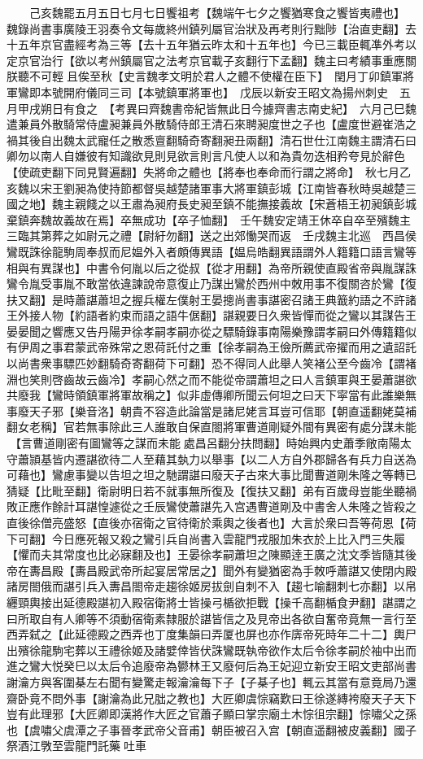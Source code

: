 　　己亥魏罷五月五日七月七日饗祖考【魏端午七夕之饗猶寒食之饗皆夷禮也】　魏錄尚書事廣陵王羽奏令文每歲終州鎮列屬官治狀及再考則行黜陟【治直吏翻】去十五年京官盡經考為三等【去十五年猶云昨太和十五年也】今已三載臣輒凖外考以定京官治行【欲以考州鎮屬官之法考京官載子亥翻行下孟翻】魏主曰考績事重應關朕聽不可輕且俟至秋【史言魏孝文明於君人之體不使權在臣下】　閏月丁卯鎮軍將軍鸞即本號開府儀同三司【本號鎮軍將軍也】　戊辰以新安王昭文為揚州刺史　五月甲戌朔日有食之　【考異曰齊魏書帝紀皆無此日今據齊書志南史紀】　六月己巳魏遣兼員外散騎常侍盧昶兼員外散騎侍郎王清石來聘昶度世之子也【盧度世避崔浩之禍其後自出魏太武寵任之散悉亶翻騎奇寄翻昶丑兩翻】清石世仕江南魏主謂清石曰卿勿以南人自嫌彼有知識欲見則見欲言則言凡使人以和為貴勿迭相矜夸見於辭色【使疏吏翻下同見賢遍翻】失將命之體也【將奉也奉命而行謂之將命】　秋七月乙亥魏以宋王劉昶為使持節都督吳越楚諸軍事大將軍鎮彭城【江南皆春秋時吳越楚三國之地】魏主親餞之以王肅為昶府長史昶至鎮不能撫接義故【宋蒼梧王初昶鎮彭城棄鎮奔魏故義故在焉】卒無成功【卒子恤翻】　壬午魏安定靖王休卒自卒至殯魏主三臨其第葬之如尉元之禮【尉紆勿翻】送之出郊慟哭而返　壬戌魏主北巡　西昌侯鸞既誅徐龍駒周奉叔而尼媪外入者頗傳異語【媪烏皓翻異語謂外人籍籍口語言鸞等相與有異謀也】中書令何胤以后之從叔【從才用翻】為帝所親使直殿省帝與胤謀誅鸞令胤受事胤不敢當依違諫說帝意復止乃謀出鸞於西州中敇用事不復關咨於鸞【復扶又翻】是時蕭諶蕭坦之握兵權左僕射王晏摠尚書事諶密召諸王典籖約語之不許諸王外接人物【約語者約束而語之語牛倨翻】諶親要日久衆皆憚而從之鸞以其謀告王晏晏聞之響應又告丹陽尹徐孝嗣孝嗣亦從之驃騎錄事南陽樂豫謂孝嗣曰外傳籍籍似有伊周之事君蒙武帝殊常之恩荷託付之重【徐孝嗣為王儉所薦武帝擢而用之遺詔託以尚書衆事驃匹妙翻騎奇寄翻荷下可翻】恐不得同人此舉人笑褚公至今齒冷【謂褚淵也笑則啓齒故云齒冷】孝嗣心然之而不能從帝謂蕭坦之曰人言鎮軍與王晏蕭諶欲共廢我【鸞時領鎮軍將軍故稱之】似非虛傳卿所聞云何坦之曰天下寜當有此誰樂無事廢天子邪【樂音洛】朝貴不容造此論當是諸尼姥言耳豈可信耶【朝直遥翻姥莫補翻女老稱】官若無事除此三人誰敢自保直閤將軍曹道剛疑外間有異密有處分謀未能【言曹道剛密有圖鸞等之謀而未能處昌呂翻分扶問翻】時始興内史蕭季敞南陽太守蕭頴基皆内遷諶欲待二人至藉其埶力以舉事【以二人方自外郡歸各有兵力自送為可藉也】鸞慮事變以告坦之坦之馳謂諶曰廢天子古來大事比聞曹道剛朱隆之等轉已猜疑【比毗至翻】衛尉明日若不就事無所復及【復扶又翻】弟有百歲母豈能坐聽禍敗正應作餘計耳諶惶遽從之壬辰鸞使蕭諶先入宫遇曹道剛及中書舍人朱隆之皆殺之直後徐僧亮盛怒【直後亦宿衛之官待衛於乘輿之後者也】大言於衆曰吾等荷恩【荷下可翻】今日應死報又殺之鸞引兵自尚書入雲龍門戎服加朱衣於上比入門三失履【懼而夫其常度也比必寐翻及也】王晏徐孝嗣蕭坦之陳顯逹王廣之沈文季皆隨其後帝在夀昌殿【夀昌殿武帝所起宴居常居之】聞外有變猶密為手敇呼蕭諶又使閉内殿諸房閤俄而諶引兵入夀昌閤帝走趨徐姬房拔劍自刺不入【趨七喻翻刺七亦翻】以帛纒頸輿接出延德殿諶初入殿宿衛將士皆操弓楯欲拒戰【操千高翻楯食尹翻】諶謂之曰所取自有人卿等不須動宿衛素隸服於諶皆信之及見帝出各欲自奮帝竟無一言行至西弄弑之【此延德殿之西弄也丁度集韻曰弄厦也屏也亦作㢅帝死時年二十二】輿尸出殯徐龍駒宅葬以王禮徐姬及諸嬖倖皆伏誅鸞既執帝欲作太后令徐孝嗣於袖中出而進之鸞大悦癸巳以太后令追廢帝為鬰林王又廢何后為王妃迎立新安王昭文吏部尚書謝瀹方與客圍棊左右聞有變驚走報瀹瀹每下子【子棊子也】輒云其當有意竟局乃還齋卧竟不問外事【謝瀹為此兄朏之教也】大匠卿虞悰竊歎曰王徐遂縳袴廢天子天下豈有此理邪【大匠卿即漢將作大匠之官蕭子顯曰掌宗廟土木悰徂宗翻】悰嘯父之孫也【虞嘯父虞潭之子事晉孝武帝父音甫】朝臣被召入宫【朝直遥翻被皮義翻】國子祭酒江斆至雲龍門託藥吐車